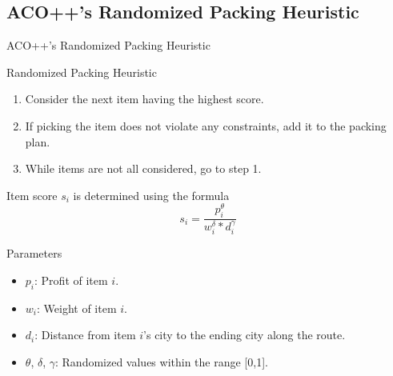 \documentclass[aspectratio=169]{beamer}
\begin{document}
\subsection{ACO++'s Randomized Packing Heuristic}
\begin{frame}{ACO++'s Randomized Packing Heuristic}
    \begin{block}{Randomized Packing Heuristic}
        \begin{enumerate}
            \justifying
            \footnotesize
            \item Consider the next item having the highest score.
            \item If picking the item does not violate any constraints, add it to the packing plan.
            \item While items are not all considered, go to step 1.
        \end{enumerate}
    \end{block}
    \pause
    \begin{block}{Item score $s_i$ is determined using the formula}
        \footnotesize
        $$s_i = \frac{p_i^\theta}{w_i^\delta * d_i^\gamma}$$
    \end{block}
    \pause
    \begin{block}{Parameters}
        \begin{itemize}
            \footnotesize
            \justifying
            \item $p_i$: Profit of item $i$.
            \item $w_i$: Weight of item $i$.
            \item $d_i$: Distance from item $i$'s city to the ending city along the route.
            \item $\theta$, $\delta$, $\gamma$: Randomized values within the range [0,1].
        \end{itemize}
    \end{block}
\end{frame}



\end{document}
